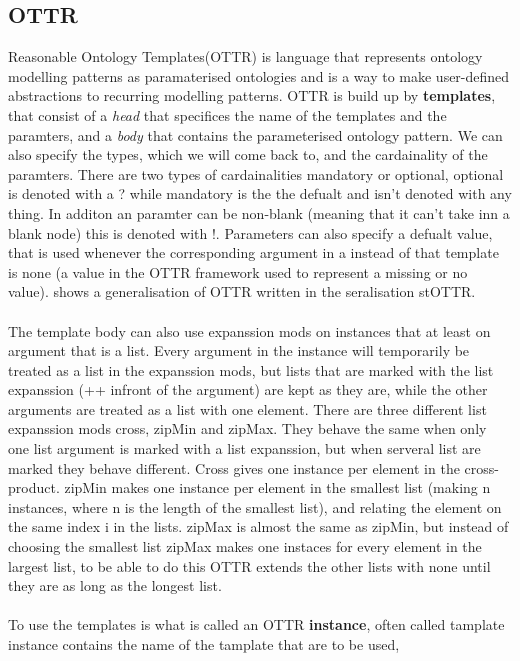 \subsection{OTTR}
Reasonable Ontology Templates(OTTR) is language that represents ontology modelling patterns as paramaterised 
ontologies and is a way to make user-defined abstractions to recurring modelling patterns. 
OTTR is build up by \textbf{templates}, that consist of a \textit{head} that specifices the name of the templates
and the paramters, and a \textit{body} that contains the parameterised ontology pattern. We can also specify the types, which we will come back to, 
and the cardainality of the paramters. There are two types of cardainalities mandatory or optional, optional is denoted with 
a ? while mandatory is the the defualt and isn't denoted with any thing. In additon an paramter can be non-blank (meaning that it can't take inn 
a blank node) this is denoted with !. Parameters can also specify a defualt value, that is used 
whenever the corresponding argument in a instead of that template is none (a value in the OTTR framework used to represent a missing or no value). 
 shows a generalisation of OTTR written in the seralisation stOTTR.
\\ \\
The template body can also use expanssion mods on instances that 
at least on argument that is a list. Every argument in the instance will temporarily be treated as a list in the expanssion mods, but lists that 
are marked with the list expanssion (++ infront of the argument) are kept as they are, while the other arguments are treated as 
a list with one element. There are three different list expanssion mods cross, zipMin and zipMax. They behave the same when only one list argument
is marked with a list expanssion, but when serveral list are marked they behave different. Cross gives one instance per element in the cross-product. zipMin 
makes one instance per element in the smallest list (making n instances, where n is the length of the smallest list), and relating the element on the same index 
i in the lists. zipMax is almost the same as zipMin, but instead of choosing the smallest list zipMax makes one instaces for every element in the largest list,
to be able to do this OTTR extends the other lists with none until they are as long as the longest list.   
\\ \\
To use the templates is what is called an OTTR \textbf{instance}, often called tamplate instance contains the name of the tamplate that are to be used, 
